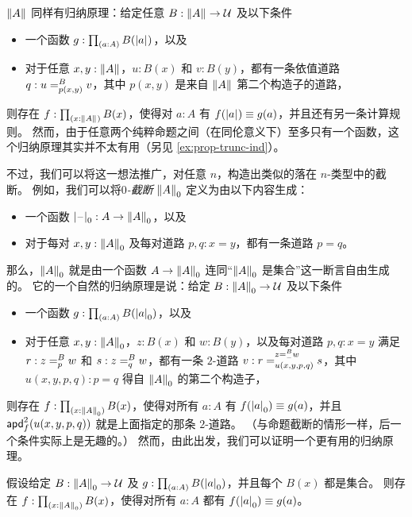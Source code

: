 %
$\brck A$ 同样有归纳原理：给定任意 $B:\brck A \to \type$ 及以下条件

\begin{itemize}
\item 一个函数 $g:\prd{a:A} B(\bproj a)$，以及
\item 对于任意 $x,y:\brck A$，$u:B(x)$ 和 $v:B(y)$，都有一条依值道路 $q:\dpath{B}{p(x,y)}{u}{v}$，其中 $p(x,y)$ 是来自 $\brck A$ 第二个构造子的道路，
\end{itemize}

则存在 $f:\prd{x:\brck A} B(x)$，使得对 $a:A$ 有 $f(\bproj a)\jdeq g(a)$，并且还有另一条计算规则。
然而，由于任意两个纯粹命题之间（在同伦意义下）至多只有一个函数，这个归纳原理其实并不太有用（另见 \cref{ex:prop-trunc-ind}）。

%
%

%
不过，我们可以将这一想法推广，对任意 $n$，构造出类似的落在 $n$-类型中的截断。
例如，我们可以将\emph{$0$-截断} $\trunc0A$ 定义为由以下内容生成：

\begin{itemize}
\item 一个函数 $\tprojf0 : A \to \trunc0 A$，以及
\item 对于每对 $x,y:\trunc0A$ 及每对道路 $p,q:x=y$，都有一条道路 $p=q$。
\end{itemize}

那么，$\trunc0A$ 就是由一个函数 $A\to \trunc0A$ 连同``$\trunc0A$ 是集合''这一断言自由生成的。
它的一个自然的归纳原理是说：给定 $B:\trunc0 A \to \type$ 及以下条件

\begin{itemize}
\item 一个函数 $g:\prd{a:A} B(\tproj0a)$，以及
\item 对于任意 $x,y:\trunc0A$，$z:B(x)$ 和 $w:B(y)$，以及每对道路 $p,q:x=y$ 满足 $r:\dpath{B}{p}{z}{w}$ 和 $s:\dpath{B}{q}{z}{w}$，都有一条 $2$-道路 $v:\dpath{\dpath{B}{-}{z}{w}}{u(x,y,p,q)}{r}{s}$，其中 $u(x,y,p,q):p=q$ 得自 $\trunc0A$ 的第二个构造子，
\end{itemize}

则存在 $f:\prd{x:\trunc0A} B(x)$，使得对所有 $a:A$ 有 $f(\tproj0a)\jdeq g(a)$，并且 $\apdtwo{f}{u(x,y,p,q)}$ 就是上面指定的那条 $2$-道路。
（与命题截断的情形一样，后一个条件实际上是无趣的。）
然而，由此出发，我们可以证明一个更有用的归纳原理。

\begin{lem}\label{thm:trunc0-ind}
  假设给定 $B:\trunc0 A \to \type$ 及 $g:\prd{a:A} B(\tproj0a)$，并且每个 $B(x)$ 都是集合。
  则存在 $f:\prd{x:\trunc0A} B(x)$，使得对所有 $a:A$ 都有 $f(\tproj0a)\jdeq g(a)$。
\end{lem}

